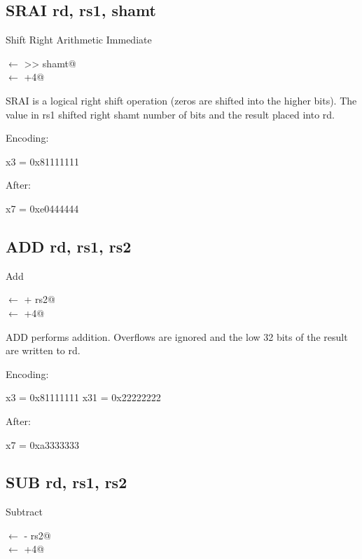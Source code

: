\subsection{SRAI rd, rs1, shamt}

Shift Right Arithmetic Immediate

\verb@rd@ $\leftarrow$  >> shamt@\\
\verb@pc@ $\leftarrow$ \verb@pc+4@

SRAI is a logical right shift operation (zeros are shifted
into the higher bits).  The value in rs1 shifted right shamt
number of bits and the result placed into rd.~\cite[p.~14]{rvismv1v22:2017}

Encoding:


x3 = 0x81111111

After:

x7 = 0xe0444444


\subsection{ADD rd, rs1, rs2}

Add 

\verb@rd@ $\leftarrow$  + rs2@\\
\verb@pc@ $\leftarrow$ \verb@pc+4@

ADD performs addition. Overflows are ignored and the low 32 bits of 
the result are written to rd.~\cite[p.~15]{rvismv1v22:2017}

Encoding:


x3  = 0x81111111
x31 = 0x22222222

After:

x7 = 0xa3333333

\subsection{SUB rd, rs1, rs2}

Subtract

\verb@rd@ $\leftarrow$  - rs2@\\
\verb@pc@ $\leftarrow$ \verb@pc+4@

